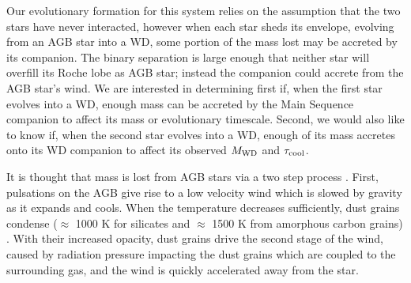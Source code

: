 \documentclass{emulateapj}
\begin{document}
Our evolutionary formation for this system relies on the assumption that the two stars have never interacted, however when each star sheds its envelope, evolving from an AGB star into a WD, some portion of the mass lost may be accreted by its companion. The binary separation is large enough that neither star will overfill its Roche lobe as AGB star; instead the companion could accrete from the AGB star's wind. We are interested in determining first if, when the first star evolves into a WD, enough mass can be accreted by the Main Sequence companion to affect its mass or evolutionary timescale. Second, we would also like to know if, when the second star evolves into a WD, enough of its mass accretes onto its WD companion to affect its observed $M_{\rm WD}$ and $\tau_{\rm cool}$.


It is thought that mass is lost from AGB stars via a two step process \citep[see][and references therein]{vassiliadis93}. First, pulsations on the AGB give rise to a low velocity wind which is slowed by gravity as it expands and cools. When the temperature decreases sufficiently, dust grains condense ($\approx$ 1000 K for silicates and $\approx$ 1500 K from amorphous carbon grains) \citep{hofner09}. With their increased opacity, dust grains drive the second stage of the wind, caused by radiation pressure impacting the dust grains which are coupled to the surrounding gas, and the wind is quickly accelerated away from the star. 

\end{document}
